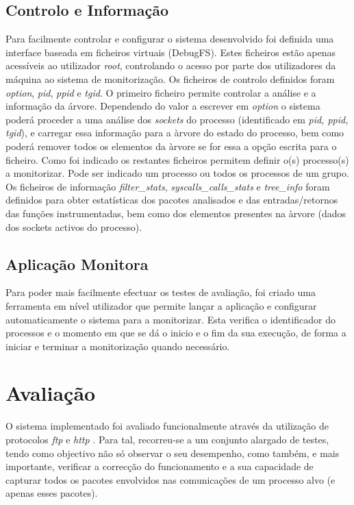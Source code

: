 \documentclass[a4paper]{llncs}
\begin{document}
\subsection*{Controlo e Informação}
\label{sub:data_information}

Para facilmente controlar e configurar o sistema desenvolvido foi definida uma interface baseada em ficheiros virtuais (DebugFS). Estes ficheiros estão apenas acessíveis ao utilizador \textit{root}, controlando o acesso por parte dos utilizadores da máquina ao sistema de monitorização. Os ficheiros de controlo definidos foram \textit{option}, \textit{pid}, \textit{ppid} e \textit{tgid}. O primeiro ficheiro permite controlar a análise e a informação da árvore. Dependendo do valor a escrever em \textit{option} o sistema poderá proceder a uma análise dos \textit{sockets} do processo (identificado em \textit{pid, ppid, tgid}), e carregar essa informação para a àrvore do estado do processo, bem como poderá remover todos os elementos da àrvore se for essa a opção escrita para o ficheiro. Como foi indicado os restantes ficheiros permitem definir o(s) processo(s) a monitorizar. Pode ser indicado um processo ou todos os processos de um grupo. Os ficheiros de informação \textit{filter\_stats},  \textit{syscalls\_calls\_stats} e \textit{tree\_info} foram definidos para obter estatísticas dos pacotes analisados e das entradas/retornos das funções instrumentadas, bem como dos elementos presentes na àrvore (dados dos sockets activos do processo).


\subsection{Aplicação Monitora}
\label{sub:monitor_app}

Para poder mais facilmente efectuar os testes de avaliação, foi criado uma ferramenta em nível utilizador que permite lançar a aplicação e configurar automaticamente o sistema para a monitorizar. Esta verifica o identificador do processos e o momento em que se dá o inicio e o fim da sua execução, de forma a iniciar e terminar a monitorização quando necessário.



\section{Avaliação}
\label{sec:evaluation}

O sistema implementado foi avaliado funcionalmente através da utilização de protocolos \textit{ftp}\cite{ftp-proto} e \textit{http} \cite{HypTraProHTT}. Para tal, recorreu-se a um conjunto alargado de testes, tendo como objectivo não só observar o seu desempenho, como também, e mais importante, verificar a correcção do funcionamento e a sua capacidade de capturar todos os pacotes envolvidos nas comunicações de um processo alvo (e apenas esses pacotes). 
\end{document}
